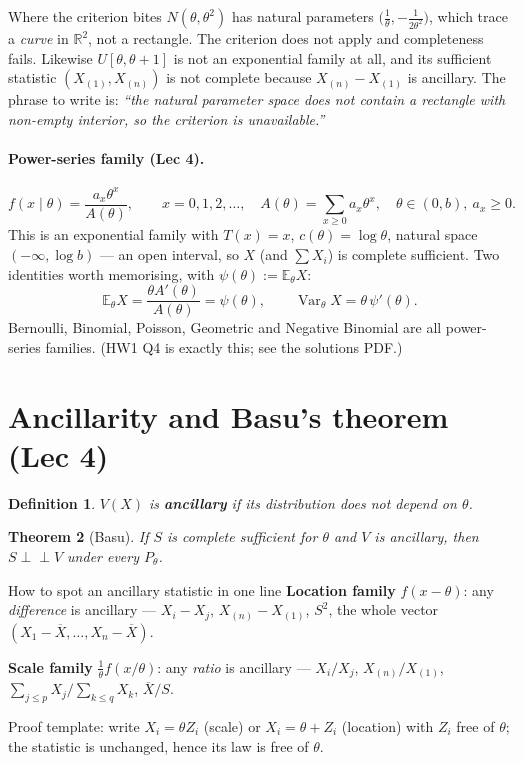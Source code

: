 \documentclass[11pt]{article}
\newtheorem{theorem}{Theorem}[section]
\newtheorem{definition}[theorem]{Definition}
\theoremstyle{remark}
\newcommand{\E}{\mathbb{E}}
\newcommand{\Var}{\operatorname{Var}}
\newcommand{\R}{\mathbb{R}}
\newcommand{\Xbar}{\overline{X}}
\newcommand{\ind}{\perp\!\!\!\perp}
\begin{document}
\begin{warnbox}{Where the criterion bites}
$N(\theta,\theta^2)$ has natural parameters $\big(\tfrac{1}{\theta},-\tfrac{1}{2\theta^2}\big)$,
which trace a \emph{curve} in $\R^2$, not a rectangle. The criterion does not apply and
completeness fails. Likewise $U[\theta,\theta+1]$ is not an exponential family at all, and its
sufficient statistic $(X_{(1)},X_{(n)})$ is not complete because $X_{(n)}-X_{(1)}$ is ancillary.
The phrase to write is: \emph{``the natural parameter space does not contain a rectangle with
non-empty interior, so the criterion is unavailable.''}
\end{warnbox}

\paragraph{Power-series family (Lec 4).}
\[
f(x\mid\theta)=\frac{a_x\theta^x}{A(\theta)},\qquad x=0,1,2,\dots,\quad
A(\theta)=\sum_{x\ge0}a_x\theta^x,\quad \theta\in(0,b),\ a_x\ge0.
\]
This is an exponential family with $T(x)=x$, $c(\theta)=\log\theta$, natural space
$(-\infty,\log b)$ --- an open interval, so $X$ (and $\sum X_i$) is complete sufficient.
Two identities worth memorising, with $\psi(\theta):=\E_\theta X$:
\[
\boxed{\ \E_\theta X=\frac{\theta A'(\theta)}{A(\theta)}=\psi(\theta),\qquad
\Var_\theta X=\theta\,\psi'(\theta).\ }
\]
Bernoulli, Binomial, Poisson, Geometric and Negative Binomial are all power-series families.
(HW1 Q4 is exactly this; see the solutions PDF.)

\section{Ancillarity and Basu's theorem (Lec 4)}

\begin{definition}
$V(X)$ is \textbf{ancillary} if its distribution does not depend on $\theta$.
\end{definition}

\begin{theorem}[Basu]
If $S$ is complete sufficient for $\theta$ and $V$ is ancillary, then $S\ind V$ under every
$P_\theta$.
\end{theorem}

\begin{recipebox}{How to spot an ancillary statistic in one line}
\textbf{Location family} $f(x-\theta)$: any \emph{difference} is ancillary ---
$X_i-X_j$, $X_{(n)}-X_{(1)}$, $S^2$, the whole vector $(X_1-\Xbar,\dots,X_n-\Xbar)$.

\textbf{Scale family} $\tfrac1\theta f(x/\theta)$: any \emph{ratio} is ancillary ---
$X_i/X_j$, $X_{(n)}/X_{(1)}$, $\sum_{j\le p}X_j\big/\sum_{k\le q}X_k$, $\Xbar/S$.

Proof template: write $X_i=\theta Z_i$ (scale) or $X_i=\theta+Z_i$ (location) with $Z_i$
free of $\theta$; the statistic is unchanged, hence its law is free of $\theta$.
\end{recipebox}
\end{document}
